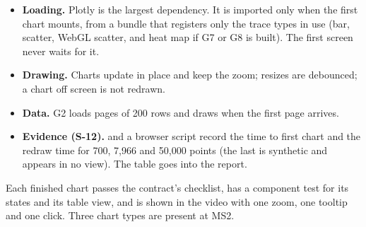 \begin{itemize}
  \item \textbf{Loading.} Plotly is the largest dependency. It is imported only when the first
    chart mounts, from a bundle that registers only the trace types in use (bar, scatter, WebGL
    scatter, and heat map if G7 or G8 is built). The first screen never waits for it.
  \item \textbf{Drawing.} Charts update in place and keep the zoom; resizes are debounced; a
    chart off screen is not redrawn.
  \item \textbf{Data.} G2 loads pages of 200 rows and draws when the first page arrives.
  \item \textbf{Evidence (S-12).}  and a browser script record the time to
    first chart and the redraw time for 700, 7,966 and 50,000 points (the last is synthetic and
    appears in no view). The table goes into the report.
\end{itemize}

\begin{done}
Each finished chart passes the contract's checklist, has a component test for its states and its
table view, and is shown in the video with one zoom, one tooltip and one click. Three chart types
are present at MS2.
\end{done}
